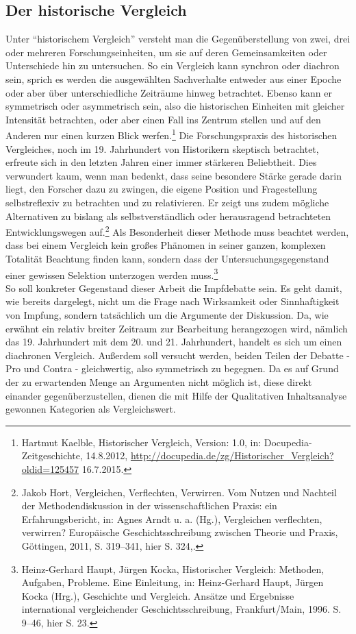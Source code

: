 \documentclass[
    a4paper,
    12pt,
    hyphens,
    chapterprefix=true,
    headheight=33pt,
    footheight=29pt,
    headings=optiontohead, %
]{scrartcl}
\begin{document}
 \subsection{Der historische Vergleich}
Unter "`historischem Vergleich"' versteht man die Gegenüberstellung von zwei, drei oder mehreren Forschungseinheiten, um sie auf deren Gemeinsamkeiten oder Unterschiede hin zu untersuchen. So ein Vergleich kann synchron oder diachron sein, sprich es werden die ausgewählten Sachverhalte entweder aus einer Epoche oder aber über unterschiedliche Zeiträume hinweg betrachtet. Ebenso kann er symmetrisch oder asymmetrisch sein, also die historischen Einheiten mit gleicher Intensität betrachten, oder aber einen Fall ins Zentrum stellen und auf den Anderen nur einen kurzen Blick werfen.\footnote{Hartmut Kaelble, Historischer Vergleich, Version: 1.0, in: Docupedia-Zeitgeschichte, 14.8.2012, \url{http://docupedia.de/zg/Historischer_Vergleich?oldid=125457} 16.7.2015.} 
Die Forschungspraxis des historischen Vergleiches, noch im 19. Jahrhundert von Historikern skeptisch betrachtet, erfreute sich in den letzten Jahren einer immer stärkeren Beliebtheit. Dies verwundert kaum, wenn man bedenkt, dass seine besondere Stärke gerade darin liegt, den Forscher dazu zu zwingen, die eigene Position und Fragestellung selbstreflexiv zu betrachten und zu relativieren. Er zeigt uns zudem mögliche Alternativen zu bislang als selbstverständlich oder herausragend betrachteten Entwicklungswegen auf.\footnote{Jakob Hort, Vergleichen, Verflechten, Verwirren. Vom Nutzen und Nachteil der Methodendiskussion in der wissenschaftlichen Praxis: ein Erfahrungsbericht, in: Agnes Arndt u. a. (Hg.), Vergleichen verflechten, verwirren? Europäische  Geschichtsschreibung zwischen Theorie und Praxis, Göttingen, 2011, S. 319--341, hier S. 324,.}  Als Besonderheit dieser Methode muss beachtet werden, dass bei einem Vergleich kein großes Phänomen in seiner ganzen, komplexen Totalität Beachtung finden kann, sondern dass der Untersuchungsgegenstand einer gewissen Selektion unterzogen werden muss.\footnote{Heinz-Gerhard Haupt, Jürgen Kocka, Historischer Vergleich: Methoden, Aufgaben, Probleme. Eine Einleitung, in: Heinz-Gerhard Haupt, Jürgen Kocka (Hrg.), Geschichte und Vergleich. Ansätze und Ergebnisse international vergleichender Geschichtsschreibung, Frankfurt/Main, 1996. S. 9--46, hier S. 23.}\\ 
So soll konkreter Gegenstand dieser Arbeit die Impfdebatte sein. Es geht damit, wie bereits dargelegt, nicht um die Frage nach Wirksamkeit oder Sinnhaftigkeit von Impfung, sondern tatsächlich um die Argumente der Diskussion. Da, wie erwähnt ein relativ breiter Zeitraum zur Bearbeitung herangezogen wird, nämlich das 19. Jahrhundert mit dem 20. und 21. Jahrhundert, handelt es sich um einen diachronen Vergleich. Außerdem soll versucht werden, beiden Teilen der Debatte - Pro und Contra - gleichwertig, also symmetrisch zu begegnen. Da es auf Grund der zu erwartenden Menge an Argumenten nicht möglich ist, diese direkt einander gegenüberzustellen, dienen die mit Hilfe der Qualitativen Inhaltsanalyse gewonnen Kategorien als Vergleichswert.
\end{document}
